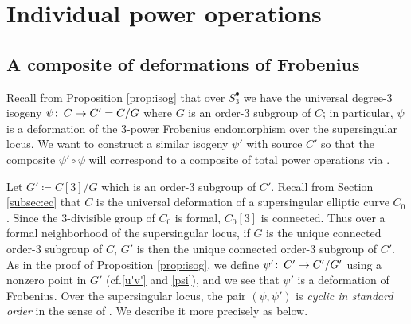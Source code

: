 \documentclass{gtpart}
\theoremstyle{definition}
\theoremstyle{remark}
\def\co{\colon\thinspace}
\newcommand{\cf}{cf.\thinspace}
\newcommand{\s}{S^\bullet}
\begin{document}
\section{Individual power operations}
\label{sec:individual}

\subsection{A composite of deformations of Frobenius}

Recall from Proposition \ref{prop:isog} that over $\s_3$ 
we have the universal degree-3 isogeny $\psi \co C \to C' = C/G$ 
where $G$ is an order-3 subgroup of $C$; 
in particular, $\psi$ is a deformation of the 3-power Frobenius endomorphism over the supersingular locus.  
We want to construct a similar isogeny $\psi'$ with source $C'$ 
so that the composite $\psi' \circ \psi$ will correspond to a composite of total power operations via \cite[Theorem B]{cong}.  

Let $G' \coloneqq C[3]/G$ which is an order-3 subgroup of $C'$.  
Recall from Section \ref{subsec:ec} that $C$ is the universal deformation of a supersingular elliptic curve $C_0$.  
Since the 3-divisible group of $C_0$ is formal, $C_0[3]$ is connected.  
Thus over a formal neighborhood of the supersingular locus, 
if $G$ is the unique connected order-3 subgroup of $C$, 
$G'$ is then the unique connected order-3 subgroup of $C'$.  
As in the proof of Proposition \ref{prop:isog}, we define $\psi' \co C' \to C'/G'$ using a nonzero point in $G'$ (\cf \eqref{u'v'} and \eqref{psi}), 
and we see that $\psi'$ is a deformation of Frobenius.  
Over the supersingular locus, the pair $(\psi, \psi')$ is {\em cyclic in standard order} in the sense of \cite[6.7.7]{KM}.  
We describe it more precisely as below.  
\end{document}
